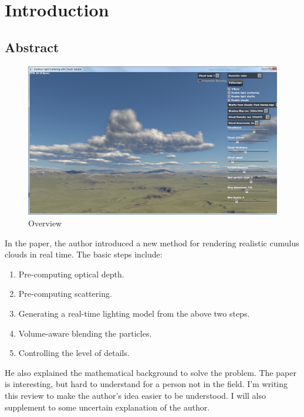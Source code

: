 \chapter{Introduction}

\section{Abstract}
\begin{figure}[htp]
\begin{center}
\includegraphics[scale=0.3]{images/overview.png}
\caption{Overview}
\label{f0}
\end{center}
\end{figure}

In the paper, the author introduced a new method for rendering realistic cumulus clouds in real time. The basic steps include:
\begin{enumerate}
\item Pre-computing optical depth.
\item Pre-computing scattering.
\item Generating a real-time lighting model from the above two steps.
\item Volume-aware blending the particles.
\item Controlling the level of details.
\end{enumerate}
He also explained the mathematical background to solve the problem. The paper is interesting, but hard to understand for a person not in the field. I'm writing this review to make the author's idea easier to be understood. I will also supplement to some uncertain explanation of the author.